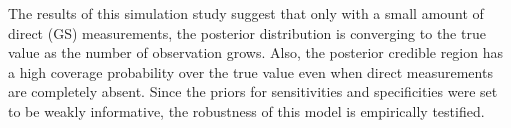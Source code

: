 \documentclass[11 pt, a4paper]{article}  %
\begin{document}
The results of this simulation study suggest that only with a small amount of direct (GS) measurements, the posterior distribution is converging to the true value as the number of observation grows. Also, the posterior credible region has a high coverage probability over the true value even when direct measurements are completely absent. Since the priors for sensitivities and specificities were set to be weakly informative, the robustness of this model is empirically testified.



\begin{table}[htbp]
\begin{adjustwidth}{-0.5in}{-1in}
\end{adjustwidth}
\end{table}






\end{document}

